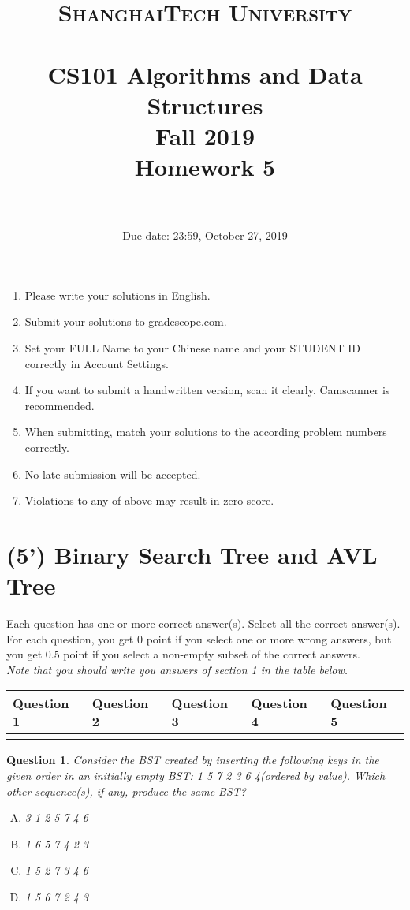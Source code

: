 \documentclass{article}
\title{
    \normalfont \normalsize
    \textsc{ShanghaiTech University} \\ [25pt]
    \horrule{0.5pt} \\[0.4cm] %
    \huge CS101 Algorithms and Data Structures\\ %
    \LARGE Fall 2019\\
    \LARGE Homework 5\\
    \horrule{2pt} \\[0.5cm] %
}
\author{}
\date{Due date: 23:59, October 27, 2019}
\newtheorem{Q}{Question}
\begin{document}
\maketitle
\thispagestyle{firstpage}
\vspace{3ex}

\begin{enumerate}
\item Please write your solutions in English. 

\item Submit your solutions to gradescope.com.  

\item Set your FULL Name to your Chinese name and your STUDENT ID correctly in Account Settings. 

\item If you want to submit a handwritten version, scan it clearly. Camscanner is recommended. 

\item When submitting, match your solutions to the according problem numbers correctly. 

\item No late submission will be accepted.

\item Violations to any of above may result in zero score. 
\end{enumerate}
\newpage

\section{(5') Binary Search Tree and AVL Tree}
Each question has one or more correct answer(s). Select all the correct answer(s). For each question, you get $0$ point if you select one or more wrong answers, but you get $0.5$ point if you select a non-empty subset of the correct answers.\\
\textit{Note that you should write you answers of section 1 in the table below.}
\begin{table}[htbp]
	\begin{tabular}{|p{2cm}|p{2cm}|p{2cm}|p{2cm}|p{2cm}|}
		\hline 
		Question 1 & Question 2 & Question 3 & Question 4 & Question 5  \\ 
		\hline 
		&  &  &  & \\ 
		\hline 
	\end{tabular} 
\end{table}
\begin{Q}
	Consider the BST created by inserting the following keys in the given order in an initially empty BST: 1 5 7 2 3 6 4(ordered by value). Which other sequence(s), if any, produce the same BST?
	\begin{enumerate}[(A)]
		\item 3 1 2 5 7 4 6
		\item 1 6 5 7 4 2 3
		\item 1 5 2 7 3 4 6
		\item 1 5 6 7 2 4 3
	\end{enumerate}
\end{Q}
\end{document}
